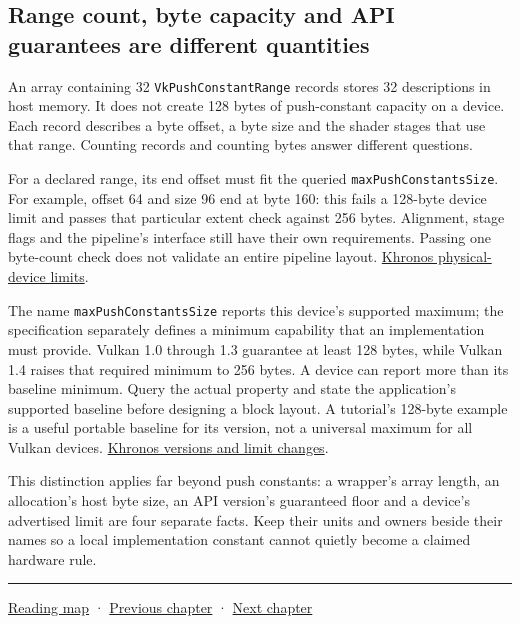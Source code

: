 \subsection{Range count, byte capacity and API guarantees are different quantities}\label{05-engine-i-ch024-range-count-byte-capacity-and-api-guarantees-are-different-quantities}

An array containing 32 \texttt{VkPushConstantRange} records stores 32 descriptions in host memory. It does not create 128 bytes of push-constant capacity on a device. Each record describes a byte offset, a byte size and the shader stages that use that range. Counting records and counting bytes answer different questions.

For a declared range, its end offset must fit the queried \texttt{maxPushConstantsSize}. For example, offset 64 and size 96 end at byte 160: this fails a 128-byte device limit and passes that particular extent check against 256 bytes. Alignment, stage flags and the pipeline's interface still have their own requirements. Passing one byte-count check does not validate an entire pipeline layout. \href{https://docs.vulkan.org/spec/latest/chapters/limits.html}{Khronos physical-device limits}.

The name \texttt{maxPushConstantsSize} reports this device's supported maximum; the specification separately defines a minimum capability that an implementation must provide. Vulkan 1.0 through 1.3 guarantee at least 128 bytes, while Vulkan 1.4 raises that required minimum to 256 bytes. A device can report more than its baseline minimum. Query the actual property and state the application's supported baseline before designing a block layout. A tutorial's 128-byte example is a useful portable baseline for its version, not a universal maximum for all Vulkan devices. \href{https://docs.vulkan.org/guide/latest/versions.html}{Khronos versions and limit changes}.

This distinction applies far beyond push constants: a wrapper's array length, an allocation's host byte size, an API version's guaranteed floor and a device's advertised limit are four separate facts. Keep their units and owners beside their names so a local implementation constant cannot quietly become a claimed hardware rule.

\begin{center}\rule{0.5\linewidth}{0.5pt}\end{center}

\hyperref[volume-reading-map]{Reading map} · \hyperref[05-engine-i-ch023-execute-and-measure-a-metal-frame]{Previous chapter} · \hyperref[06-engine-ii-ch025-renderer-evolution-through-resource-ownership]{Next chapter}
